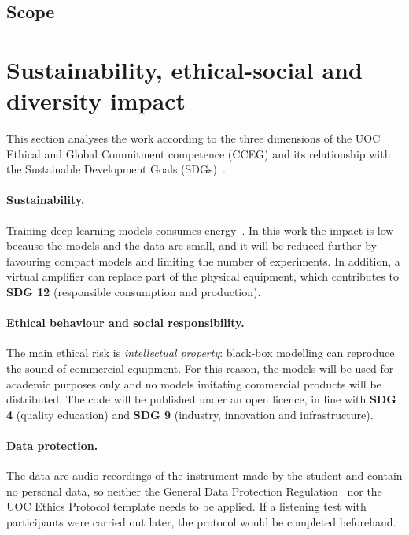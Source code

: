 \documentclass[ENG]{TFUOC}%
\begin{document}
\subsection{Scope}



\section{Sustainability, ethical-social and diversity impact}
\label{s:etic}

This section analyses the work according to the three dimensions of the UOC Ethical and Global Commitment competence (CCEG) and its relationship with the Sustainable Development Goals (SDGs)~\cite{onu2015}.

\paragraph{Sustainability.} Training deep learning models consumes energy~\cite{strubell2019}. In this work the impact is low because the models and the data are small, and it will be reduced further by favouring compact models and limiting the number of experiments. In addition, a virtual amplifier can replace part of the physical equipment, which contributes to \textbf{SDG 12} (responsible consumption and production).

\paragraph{Ethical behaviour and social responsibility.} The main ethical risk is \emph{intellectual property}: black-box modelling can reproduce the sound of commercial equipment. For this reason, the models will be used for academic purposes only and no models imitating commercial products will be distributed. The code will be published under an open licence, in line with \textbf{SDG 4} (quality education) and \textbf{SDG 9} (industry, innovation and infrastructure).

\paragraph{Data protection.} The data are audio recordings of the instrument made by the student and contain no personal data, so neither the General Data Protection Regulation~\cite{rgpd2016} nor the UOC Ethics Protocol template needs to be applied. If a listening test with participants were carried out later, the protocol would be completed beforehand.
\end{document}

